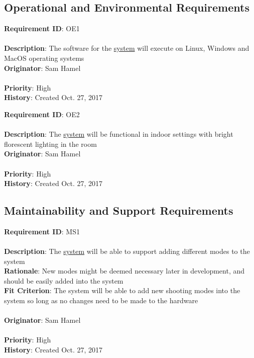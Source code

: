 \documentclass[11pt]{article}
\begin{document}
\subsection{Operational and Environmental Requirements}
\begin{framed}
	\noindent\textbf{Requirement ID}: OE1 \hfill\\\\
	\noindent\textbf{Description}: The software for the \hyperref[sec:definitions]{system} will execute on Linux, Windows and MacOS operating systems \\
	\textbf{Originator}: Sam Hamel \\\\
	\textbf{Priority}: High \hfill \\
	\noindent\textbf{History}: Created Oct. 27, 2017
\end{framed}

\begin{framed}
	\noindent\textbf{Requirement ID}: OE2 \\\\
	\noindent\textbf{Description}: The \hyperref[sec:definitions]{system} will be functional in indoor settings with bright florescent lighting in the room \\
	\textbf{Originator}: Sam Hamel \\\\
	\textbf{Priority}: High \hfill \\
	\noindent\textbf{History}: Created Oct. 27, 2017
\end{framed}

\subsection{Maintainability and Support Requirements}
\begin{framed}
	\noindent\textbf{Requirement ID}: MS1 \\\\
	\noindent\textbf{Description}: The \hyperref[sec:definitions]{system} will be able to support adding different modes to the system\\
	\textbf{Rationale}: New modes might be deemed necessary later in development, and should be easily added into the system \\
	\textbf{Fit Criterion}: The system will be able to add new shooting modes into the system so long as no changes need to be made to the hardware \\\\
	\textbf{Originator}: Sam Hamel \\\\
	\textbf{Priority}: High \hfill \\
	\noindent\textbf{History}: Created Oct. 27, 2017
\end{framed}
\end{document}
